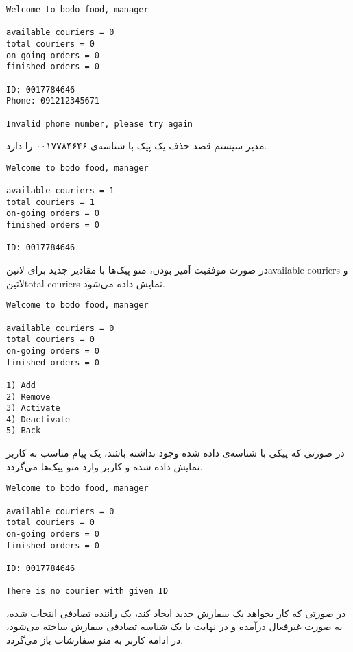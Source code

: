\begin{latin}
\begin{verbatim}
Welcome to bodo food, manager

available couriers = 0
total couriers = 0
on-going orders = 0
finished orders = 0

ID: 0017784646
Phone: 091212345671

Invalid phone number, please try again
\end{verbatim}
\end{latin}

مدیر سیستم قصد حذف یک پیک با شناسه‌ی ۰۰۱۷۷۸۴۶۴۶ را دارد.

\begin{latin}
\begin{verbatim}
Welcome to bodo food, manager

available couriers = 1
total couriers = 1
on-going orders = 0
finished orders = 0

ID: 0017784646

\end{verbatim}
\end{latin}

در صورت موفقیت آمیز بودن، منو پیک‌ها با مقادیر جدید برای ‌لاتین{available couriers} و ‌لاتین{total couriers} نمایش داده می‌شود.

\begin{latin}
\begin{verbatim}
Welcome to bodo food, manager

available couriers = 0
total couriers = 0
on-going orders = 0
finished orders = 0

1) Add
2) Remove
3) Activate
4) Deactivate
5) Back
\end{verbatim}
\end{latin}

در صورتی که پیکی با شناسه‌ی داده شده وجود نداشته باشد، یک پیام مناسب به کاربر نمایش داده شده و کاربر وارد منو پیک‌ها می‌گردد.

\begin{latin}
\begin{verbatim}
Welcome to bodo food, manager

available couriers = 0
total couriers = 0
on-going orders = 0
finished orders = 0

ID: 0017784646

There is no courier with given ID
\end{verbatim}
\end{latin}

در صورتی که کار بخواهد یک سفارش جدید ایجاد کند، یک راننده تصادفی انتخاب شده، به صورت غیرفعال درآمده و در نهایت با یک شناسه تصادفی سفارش ساخته می‌شود، در ادامه کاربر به منو سفارشات باز می‌گردد.

